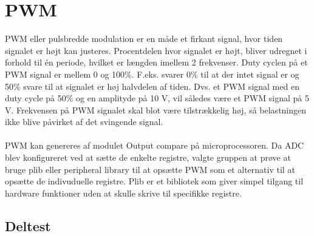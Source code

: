 \section{PWM}
PWM eller pulsbredde modulation er en måde et firkant signal, hvor tiden signalet er højt kan justeres. Procentdelen hvor signalet er højt, bliver udregnet i forhold til én periode, hvilket er længden imellem 2 frekvenser. Duty cyclen på et PWM signal er mellem 0 og 100\%. F.eks. svarer 0\% til at der intet signal er og 50\% svare til at signalet er høj halvdelen af tiden. Dvs. et PWM signal med en duty cycle på 50\% og en amplityde på 10 V, vil således være et PWM signal på 5 V. Frekvensen på PWM signalet skal blot være tilstrækkelig høj, så belastningen ikke blive påvirket af det svingende signal. 
\\
\\
PWM kan genereres af modulet Output compare på microprocessoren. Da ADC blev konfigureret ved at sætte de enkelte registre, valgte gruppen at prøve at bruge plib eller peripheral library til at opsætte PWM som et alternativ til at opsætte de indivuduelle registre. Plib er et bibliotek som giver simpel tilgang til hardware funktioner uden at skulle skrive til specifikke registre.









\subsection{Deltest}